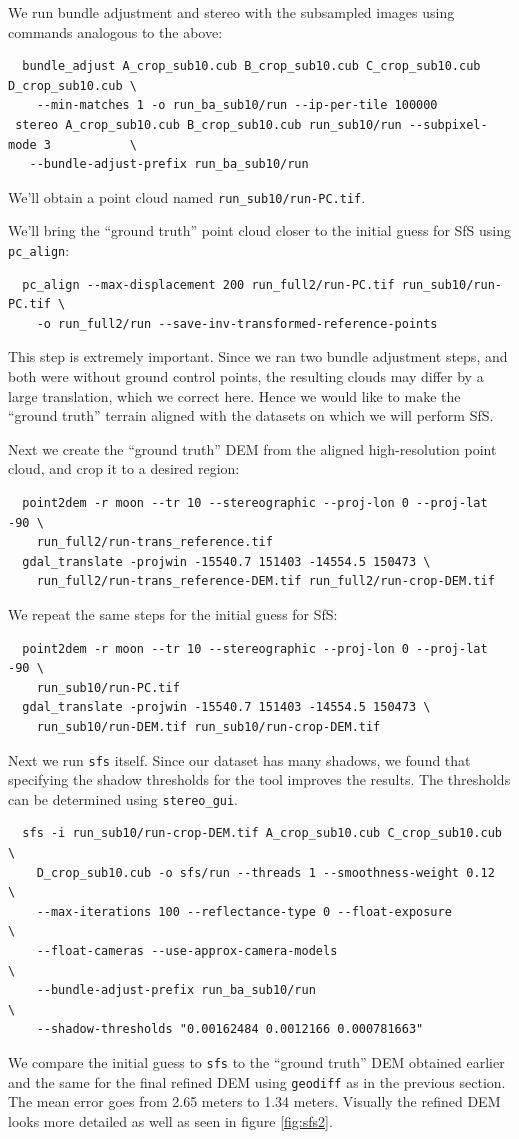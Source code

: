 We run bundle adjustment and stereo with the subsampled images using
commands analogous to the above:
\begin{verbatim}
  bundle_adjust A_crop_sub10.cub B_crop_sub10.cub C_crop_sub10.cub D_crop_sub10.cub \
    --min-matches 1 -o run_ba_sub10/run --ip-per-tile 100000
 stereo A_crop_sub10.cub B_crop_sub10.cub run_sub10/run --subpixel-mode 3           \
   --bundle-adjust-prefix run_ba_sub10/run
\end{verbatim}
We'll obtain a point cloud named \verb#run_sub10/run-PC.tif#.

We'll bring the ``ground truth'' point cloud closer to the initial guess
for SfS using \texttt{pc\_align}:
\begin{verbatim}
  pc_align --max-displacement 200 run_full2/run-PC.tif run_sub10/run-PC.tif \
    -o run_full2/run --save-inv-transformed-reference-points
\end{verbatim}
This step is extremely important. Since we ran two bundle adjustment
steps, and both were without ground control points, the resulting clouds
may differ by a large translation, which we correct here. Hence we would like to 
make the ``ground truth'' terrain aligned with the datasets on which we 
will perform SfS. 

Next we create the ``ground truth'' DEM from the aligned high-resolution
point cloud, and crop it to a desired region:
\begin{verbatim}
  point2dem -r moon --tr 10 --stereographic --proj-lon 0 --proj-lat -90 \
    run_full2/run-trans_reference.tif
  gdal_translate -projwin -15540.7 151403 -14554.5 150473 \
    run_full2/run-trans_reference-DEM.tif run_full2/run-crop-DEM.tif
\end{verbatim}
We repeat the same steps for the initial guess for SfS:
\begin{verbatim}
  point2dem -r moon --tr 10 --stereographic --proj-lon 0 --proj-lat -90 \
    run_sub10/run-PC.tif
  gdal_translate -projwin -15540.7 151403 -14554.5 150473 \
    run_sub10/run-DEM.tif run_sub10/run-crop-DEM.tif
\end{verbatim}
Next we run \texttt{sfs} itself. Since our dataset has many shadows, we found
that specifying the shadow thresholds for the tool improves the
results. The thresholds can be determined using \texttt{stereo\_gui}.
\begin{verbatim}
  sfs -i run_sub10/run-crop-DEM.tif A_crop_sub10.cub C_crop_sub10.cub \
    D_crop_sub10.cub -o sfs/run --threads 1 --smoothness-weight 0.12  \
    --max-iterations 100 --reflectance-type 0 --float-exposure        \
    --float-cameras --use-approx-camera-models                        \
    --bundle-adjust-prefix run_ba_sub10/run                           \
    --shadow-thresholds "0.00162484 0.0012166 0.000781663"
\end{verbatim}
We compare the initial guess to \texttt{sfs} to the ``ground truth'' DEM
obtained earlier and the same for the final refined DEM using
\texttt{geodiff} as in the previous section. The mean error goes from
2.65 meters to 1.34 meters. Visually the refined DEM looks more detailed
as well as seen in figure \ref{fig:sfs2}.

